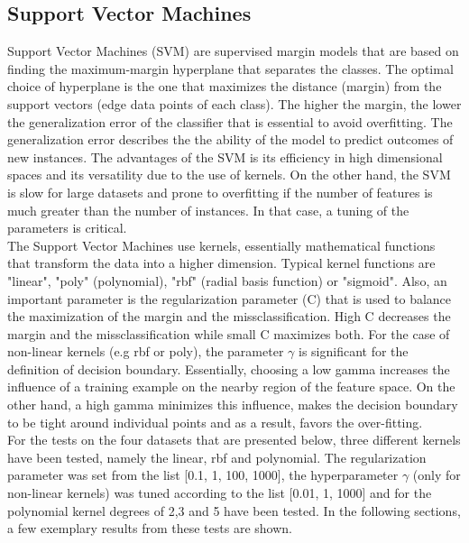 \documentclass{article}
\begin{document}
\subsection{Support Vector Machines} \label{svm}
Support Vector Machines (SVM) are supervised margin models that are based on finding the maximum-margin hyperplane that separates the classes. The optimal choice of hyperplane is the one that maximizes the distance (margin) from the support vectors (edge data points of each class). The higher the margin, the lower the generalization error of the classifier that is essential to avoid overfitting. The generalization error describes the the ability of the model to predict outcomes of new instances. The advantages of the SVM is its efficiency in high dimensional spaces and its versatility due to the use of kernels. On the other hand, the SVM is slow for large datasets and prone to overfitting if the number of features is much greater than the number of instances. In that case, a tuning of the parameters is critical.
\\
The Support Vector Machines use kernels, essentially mathematical functions that transform the data into a higher dimension. Typical kernel functions are "linear", "poly" (polynomial), "rbf" (radial basis function) or "sigmoid". Also, an important parameter is the regularization parameter (C) that is used to balance the maximization of the margin and the missclassification. High C decreases the margin and the missclassification while small C maximizes both. For the case of non-linear kernels (e.g rbf or poly), the parameter $\gamma$ is significant for the definition of decision boundary. Essentially, choosing a low gamma increases the influence of a training example on the nearby region of the feature space. On the other hand, a high gamma minimizes this influence, makes the decision boundary to be tight around individual points and as a result, favors the over-fitting.
\\
For the tests on the four datasets that are presented below, three different kernels have been tested, namely the linear, rbf and polynomial. The regularization parameter was set from the list [0.1, 1, 100, 1000], the hyperparameter $\gamma$ (only for non-linear kernels) was tuned according to the list [0.01, 1, 1000] and for the polynomial kernel degrees of 2,3 and 5 have been tested. In the following sections, a few exemplary results from these tests are shown.
\end{document}
